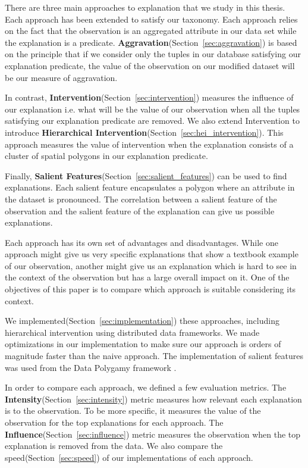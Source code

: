 There are three main approaches to explanation that we study in this thesis. Each approach has been extended to satisfy our taxonomy. Each approach relies on the fact that the observation is an aggregated attribute in our data set while the explanation is a predicate. \textbf{Aggravation}(Section~\ref{sec:aggravation}) is based on the principle that if we consider only the tuples in our database satisfying our explanation predicate, the value of the observation on our modified dataset will be our measure of aggravation\citep{roy2014formal,meliou2014causality}.

In contrast, \textbf{Intervention}(Section~\ref{sec:intervention}) measures the influence of our explanation i.e. what will be the value of our observation when all the tuples satisfying our explanation predicate are removed\citep{roy2014formal}. We also extend Intervention to introduce \textbf{Hierarchical Intervention}(Section~\ref{sec:hei_intervention}). This approach measures the value of intervention when the explanation consists of a cluster of spatial polygons in our explanation predicate.

Finally, \textbf{Salient Features}(Section~\ref{sec:salient_features}) can be used to find explanations\citep{chirigati2016data}. Each salient feature encapsulates a polygon where an attribute in the dataset is pronounced. The correlation between a salient feature of the observation and the salient feature of the explanation can give us possible explanations.

Each approach has its own set of advantages and disadvantages. While one approach might give us very specific explanations that show a textbook example of our observation, another might give us an explanation which is hard to see in the context of the observation but has a large overall impact on it. One of the objectives of this paper is to compare which approach is suitable considering its context.

We implemented(Section~\ref{sec:implementation}) these approaches, including hierarchical intervention using distributed data frameworks\citep{borthakur2007hadoop,dean2008mapreduce,shanahan2015large,zaharia2016apache}. We made optimizations in our implementation to make sure our approach is orders of magnitude faster than the naive approach. The implementation of salient features was used from the Data Polygamy framework \citep{chirigati2016data}.

In order to compare each approach, we defined a few evaluation metrics. The \textbf{Intensity}(Section~\ref{sec:intensity}) metric measures how relevant each explanation is to the observation. To be more specific, it measures the value of the observation for the top explanations for each approach. The \textbf{Influence}(Section~\ref{sec:influence}) metric measures the observation when the top explanation is removed from the data. We also compare the speed(Section~\ref{sec:speed}) of our implementations of each approach.

